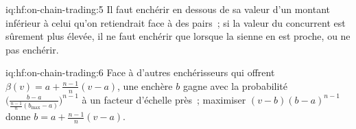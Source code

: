 \begin{solution}{iq:hf:on-chain-trading:5}
Il faut enchérir en dessous de sa valeur d'un montant inférieur à celui qu'on retiendrait face à des pairs~; si la valeur du concurrent est sûrement plus élevée,
il ne faut enchérir que lorsque la sienne en est proche, ou ne pas enchérir.
\end{solution}

\begin{solution}{iq:hf:on-chain-trading:6}
Face à d'autres enchérisseurs qui offrent $\beta(v)=a+\frac{n-1}{n}(v-a)$, une enchère $b$ gagne avec la probabilité $\bigl(\frac{b-a}{\frac{n-1}{n}(b_{\max}-a)}\bigr)^{n-1}$
à un facteur d'échelle près~; maximiser $(v-b)(b-a)^{n-1}$ donne $b=a+\frac{n-1}{n}(v-a)$.
\end{solution}
